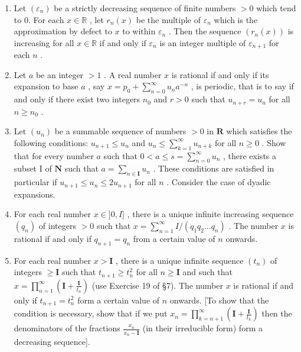\begin{enumerate}
\def\labelenumi{\arabic{enumi})}
\setcounter{enumi}{1}
\item
  Let \((\varepsilon_{n})\) be a strictly decreasing sequence of finite numbers \(>0\) which tend to 0. For each \(x \in \mathbb{R}\) , let \(r_{n}(x)\) be the multiple of \(\varepsilon_{n}\) which is the approximation by defect to \(x\) to within \(\varepsilon_{n}\) . Then the sequence \((r_{n}(x))\) is increasing for all \(x \in \mathbb{R}\) if and only if \(\varepsilon_{n}\) is an integer multiple of \(\varepsilon_{n+1}\) for each \(n\) .
\item
  Let \(a\) be an integer \(> 1\) . A real number \(x\) is rational if and only if its expansion to base \(a\) , say \(x = p_0 + \sum_{n=0}^{\infty} u_n a^{-n}\) , is periodic, that is to say if and only if there exist two integers \(n_0\) and \(r > 0\) such that \(u_{n+r} = u_n\) for all \(n \geqslant n_0\) .
\item
  Let \((u_{n})\) be a summable sequence of numbers \(>0\) in \(\mathbf{R}\) which satisfies the following conditions: \(u_{n+1} \leqslant u_{n}\) and \(u_{n} \leqslant \sum_{k=1}^{\infty} u_{n+k}\) for all \(n \geqslant 0\) . Show that for every number \(a\) such that \(0 < a \leqslant s = \sum_{n=0}^{\infty} u_{n}\) , there exists a subset I of \(\mathbf{N}\) such that \(a = \sum_{n \in \mathbf{I}} u_{n}\) . These conditions are satisfied in particular if \(u_{n+1} \leqslant u_{n} \leqslant 2u_{n+1}\) for all \(n\) . Consider the case of dyadic expansions.
\item
  For each real number \(x \in ]0, I]\) , there is a unique infinite increasing sequence \((q_n)\) of integers \(> 0\) such that \(x = \sum_{n=1}^{\infty} I / (q_1 q_2 \ldots q_n)\) . The number \(x\) is rational if and only if \(q_{n+1} = q_n\) from a certain value of \(n\) onwards.
\item
  For each real number \(x > \mathbf{I}\) , there is a unique infinite sequence \((t_n)\) of integers \(\geqslant \mathbf{I}\) such that \(t_{n+1} \geqslant t_n^2\) for all \(n \geqslant \mathbf{I}\) and such that \(x = \prod_{n=1}^{\infty} \left( \mathbf{I} + \frac{\mathbf{I}}{t_n} \right)\) (use Exercise 19 of §7). The number \(x\) is rational if and only if \(t_{n+1} = t_n^2\) form a certain value of \(n\) onwards. {[}To show that the condition is necessary, show that if we put \(x_n = \prod_{k=n+1}^{\infty} \left( \mathbf{I} + \frac{\mathbf{I}}{t_k} \right)\) then the denominators of the fractions \(\frac{x_n}{x_n - \mathbf{I}}\) (in their irreducible form) form a decreasing sequence{]}.
\end{enumerate}

